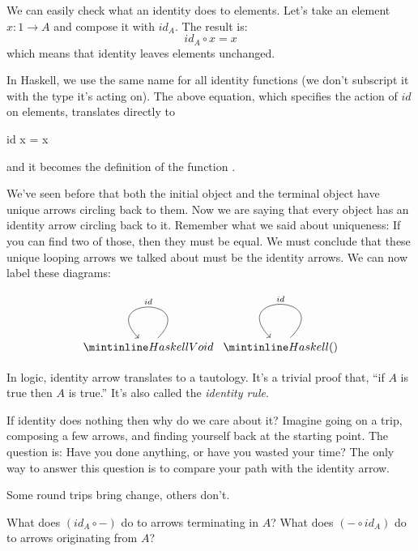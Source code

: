 \documentclass[DaoFP]{subfiles}
\begin{document}
We can easily check what an identity does to elements. Let's take an element $x \colon 1 \to A$ and compose it with $id_A$. The result is:
\[id_A \circ x = x\]
which means that identity leaves elements unchanged.

In Haskell, we use the same name  for all identity functions (we don't subscript it with the type it's acting on). The above equation, which specifies the action of $id$ on elements, translates directly to
\begin{haskell}
id x = x
\end{haskell}
and it becomes the definition of the function . 

We've seen before that both the initial object and the terminal object have unique arrows circling back to them. Now we are saying that every object has an identity arrow circling back to it. Remember what we said about uniqueness: If you can find two of those, then they must be equal. We must conclude that these unique looping arrows we talked about must be the identity arrows. We can now label these diagrams:

\[
 \begin{tikzcd}
 \hask{Void}
 \arrow[loop, "id"']
 \end{tikzcd}
 \begin{tikzcd}
 \hask{()}
 \arrow[loop, "id"']
 \end{tikzcd}
\]

In logic, identity arrow translates to a tautology. It's a trivial proof that, ``if $A$ is true then $A$ is true.'' It's also called the \emph{identity rule}.


If identity does nothing then why do we care about it? Imagine going on a trip, composing a few arrows, and finding yourself back at the starting point. The question is: Have you done anything, or have you wasted your time? The only way to answer this question is to compare your path with the identity arrow. 

Some round trips bring change, others don't.


\begin{exercise}\label{ex-yoneda-identity}
What does $(id_A \circ -)$ do to arrows terminating in $A$? What does $(- \circ id_A)$ do to arrows originating from $A$?
\end{exercise}
\end{document}
